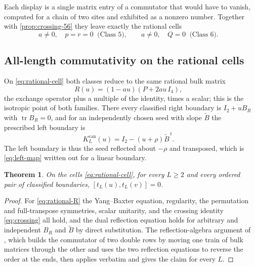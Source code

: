\documentclass[11pt,reqno]{amsart}
\theoremstyle{plain}
\newtheorem{theorem}{Theorem}[section]
\theoremstyle{definition}
\theoremstyle{remark}
\numberwithin{equation}{section}
\providecommand{\tr}{\operatorname{tr}}
\newcommand{\Id}{I_2}
\begin{document}
Each display is a single matrix entry of a commutator that would have to vanish,
computed for a chain of two sites and exhibited as a nonzero number. Together
with \cref{prop:crossing-56} they leave exactly the rational cells
\begin{equation}
a\ne0,\quad p=r=0\ \text{ (Class 5)},\qquad
a\ne0,\quad Q=0\ \text{ (Class 6)}.              \label{eq:rational-cell}
\end{equation}

\subsection{All-length commutativity on the rational cells}

On \cref{eq:rational-cell} both classes reduce to the same rational bulk matrix
\begin{equation}
R(u)=(1-au)(P+2au\,I_4),                              \label{eq:rational-R}
\end{equation}
the exchange operator plus a multiple of the identity, times a scalar; this is
the isotropic point of both families. There every classified right boundary is
$\Id+uB_R$ with $\tr B_R=0$, and for an independently chosen seed with slope
$\widetilde B$ the prescribed left boundary is
\begin{equation}
K_L^{\mathrm{can}}(u)=\Id-(u+\rho)\widetilde B^{\,t}.        \label{eq:rational-left}
\end{equation}
The left boundary is thus the seed reflected about $-\rho$ and transposed, which
is \cref{eq:left-map} written out for a linear boundary.

\begin{theorem}
\label{thm:rational-cell}
On the cells \cref{eq:rational-cell}, for every $L\ge2$ and every ordered pair of
classified boundaries, $[t_L(u),t_L(v)]=0$.
\end{theorem}

\begin{proof}
For \cref{eq:rational-R} the Yang--Baxter equation, regularity, the permutation
and full-transpose symmetries, scalar unitarity, and the crossing identity
\cref{eq:crossing} all hold, and the dual reflection equation holds for arbitrary
and independent $B_R$ and $\widetilde B$ by direct substitution. The
reflection-algebra argument of \cite{sklyanin1988}, which builds the commutator
of two double rows by moving one train of bulk matrices through the other and
uses the two reflection equations to reverse the order at the ends, then applies
verbatim and gives the claim for every $L$.
\end{proof}
\end{document}
